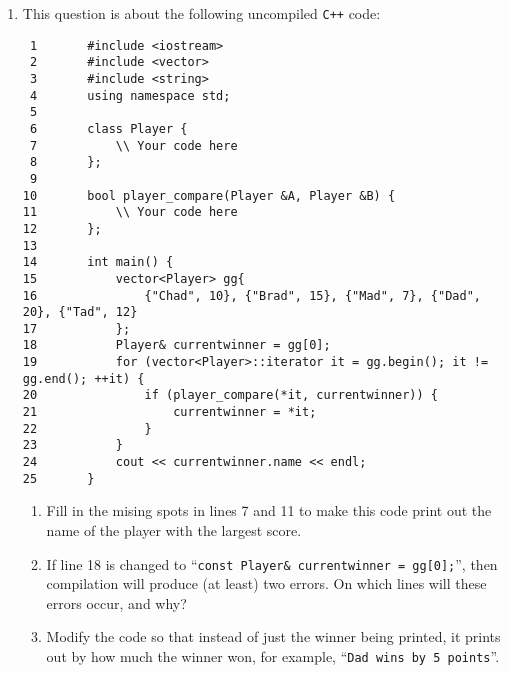 \documentclass[a4paper,12pt]{article}
\begin{document}
\begin{enumerate}
\item This question is about the following uncompiled \texttt{C++} code:
{\fontsize{9}{10}\selectfont
\begin{verbatim}
 1       #include <iostream>
 2       #include <vector>
 3       #include <string>
 4       using namespace std;
 5
 6       class Player {
 7           \\ Your code here
 8       };
 9
10       bool player_compare(Player &A, Player &B) {
11           \\ Your code here
12       };
13
14       int main() {
15           vector<Player> gg{
16               {"Chad", 10}, {"Brad", 15}, {"Mad", 7}, {"Dad", 20}, {"Tad", 12}
17           };
18           Player& currentwinner = gg[0];
19           for (vector<Player>::iterator it = gg.begin(); it != gg.end(); ++it) {
20               if (player_compare(*it, currentwinner)) {
21                   currentwinner = *it;
22               }
23           }
24           cout << currentwinner.name << endl;
25       }
\end{verbatim}
}
\vspace{5pt}
\begin{enumerate}
\item Fill in the mising spots in lines 7 and 11 to make this code print out the name of the player with the largest score.\\
\item If line 18 is changed to ``\texttt{const Player\& currentwinner = gg[0];}'', then compilation will produce (at least) two errors. On which lines will these errors occur, and why?\\
\item Modify the code so that instead of just the winner being printed, it prints out by how much the winner won, for example, ``\texttt{Dad wins by 5 points}''.
\end{enumerate}

\end{enumerate}
\end{document}
